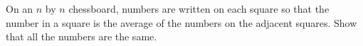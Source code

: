 On an $n$ by $n$ chessboard, numbers are written on each square so that the number in a square is the average of the numbers on the adjacent squares. Show that all the numbers are the same.